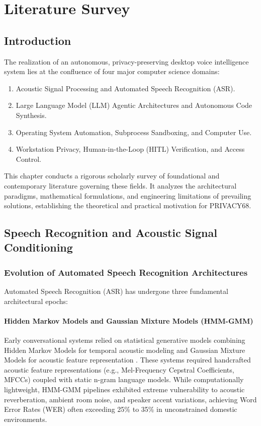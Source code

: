 \chapter{Literature Survey}
\label{ch:literature_survey}

\section{Introduction}
The realization of an autonomous, privacy-preserving desktop voice intelligence system lies at the confluence of four major computer science domains:
\begin{enumerate}
    \item Acoustic Signal Processing and Automated Speech Recognition (ASR).
    \item Large Language Model (LLM) Agentic Architectures and Autonomous Code Synthesis.
    \item Operating System Automation, Subprocess Sandboxing, and Computer Use.
    \item Workstation Privacy, Human-in-the-Loop (HITL) Verification, and Access Control.
\end{enumerate}

This chapter conducts a rigorous scholarly survey of foundational and contemporary literature governing these fields. It analyzes the architectural paradigms, mathematical formulations, and engineering limitations of prevailing solutions, establishing the theoretical and practical motivation for PRIVACY68.

\section{Speech Recognition and Acoustic Signal Conditioning}

\subsection{Evolution of Automated Speech Recognition Architectures}
Automated Speech Recognition (ASR) has undergone three fundamental architectural epochs:

\subsubsection{Hidden Markov Models and Gaussian Mixture Models (HMM-GMM)}
Early conversational systems relied on statistical generative models combining Hidden Markov Models for temporal acoustic modeling and Gaussian Mixture Models for acoustic feature representation \cite{schuster2018speech}. These systems required handcrafted acoustic feature representations (e.g., Mel-Frequency Cepstral Coefficients, MFCCs) coupled with static n-gram language models. While computationally lightweight, HMM-GMM pipelines exhibited extreme vulnerability to acoustic reverberation, ambient room noise, and speaker accent variations, achieving Word Error Rates (WER) often exceeding 25\% to 35\% in unconstrained domestic environments.

